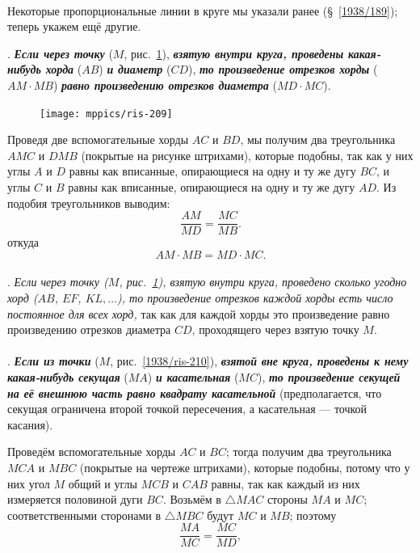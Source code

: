 \documentclass[oneside]{book}
\begin{document}
\paragraph{}\label{1938/199}
Некоторые пропорциональные линии в круге мы указали ранее (§~\ref{1938/189});
теперь укажем ещё другие.

\smallskip
\mbox{.}
\textbf{\emph{Если через точку}} ($M$, рис.~\ref{1938/ris-209}), \textbf{\emph{взятую внутри круга, проведены какая-нибудь хорда}} ($AB$) \textbf{\emph{и диаметр}} ($CD$), \textbf{\emph{то произведение отрезков хорды}} ($AM\cdot  MB$) \textbf{\emph{равно произведению отрезков диаметра}} ($MD\cdot  MC$).

\begin{figure}
\centering
\texttt{[image: mppics/ris-209]}
\caption{}\label{1938/ris-209}
\end{figure}

Проведя две вспомогательные хорды $AC$ и $BD$, мы получим два треугольника $AMC$ и $DMB$ (покрытые на рисунке штрихами), которые подобны, так как у них углы $A$ и $D$ равны как вписанные, опирающиеся на одну и ту же дугу $BC$, и углы $C$ и $B$ равны как вписанные, опирающиеся на одну и ту же дугу $AD$.
Из подобия треугольников выводим:
\[\frac{AM}{MD}=\frac{MC}{MB}.\]
откуда
\[AM\cdot  MB=MD\cdot  MC.\]

\paragraph{}\label{1938/200}
.
\emph{Если через точку \emph{($M$, рис.~\ref{1938/ris-209}),} взятую внутри круга, проведено сколько угодно хорд ($AB$, $EF$, $KL,\dots$), то произведение отрезков каждой хорды есть число постоянное для всех хорд,} так как для каждой хорды это произведение равно произведению отрезков диаметра $CD$, проходящего через взятую точку $M$.

\paragraph{}\label{1938/201}
.
\textbf{\emph{Если из точки}} ($M$, рис.~\ref{1938/ris-210}), \textbf{\emph{взятой вне круга, проведены к нему какая-нибудь секущая}} ($MA$) \textbf{\emph{и касательная}} ($MC$), \textbf{\emph{то произведение секущей на её внешнюю часть равно квадрату касательной}} (предполагается, что секущая ограничена второй точкой пересечения, а касательная — точкой касания).

Проведём вспомогательные хорды $AC$ и $BC$;
тогда получим два треугольника $MCA$ и $MBC$ (покрытые на чертеже штрихами), которые подобны, потому что у них угол $M$ общий и углы $MCB$ и $CAB$ равны, так как каждый из них измеряется половиной дуги $BC$.
Возьмём в $\triangle MAC$ стороны $MA$ и $MC$;
соответственными сторонами в $\triangle MBC$ будут $MC$ и $MB$;
поэтому
\[\frac{MA}{MC} = \frac{MC}{MD},\]
\end{document}

